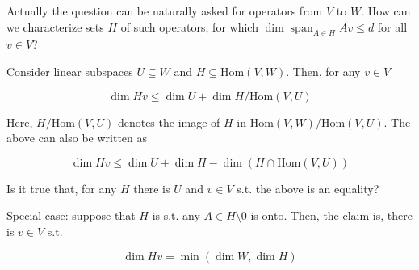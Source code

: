 \documentclass[a4paper]{article}
\DeclareMathOperator{\Sp}{span}
\newcommand{\AP}[1]{\left(#1\right)}
\newcommand{\Hom}{\mathrm{Hom}}
\begin{document}
Actually the question can be naturally asked for operators from $V$ to $W$. How can we characterize sets $H$ of such operators, for which $\dim\Sp_{A\in H} Av\leq d$ for all $v\in V$?

Consider linear subspaces $U\subseteq W$ and $H\subseteq \Hom(V,W)$. Then, for any $v\in V$

\[\dim Hv \leq \dim U + \dim H/\Hom(V,U)\]

Here, $H/\Hom(V,U)$ denotes the image of $H$ in $\Hom(V,W)/\Hom(V,U)$. The above can also be written as

\[\dim Hv\leq\dim U+\dim H-\dim\AP{H\cap\Hom(V,U)}\]

Is it true that, for any $H$ there is $U$ and $v\in V$ s.t. the above is an equality?

Special case: suppose that $H$ is s.t. any $A\in H\setminus0$ is onto. Then, the claim is, there is $v\in V$ s.t.

\[\dim Hv = \min(\dim W, \dim H)\]
\end{document}
